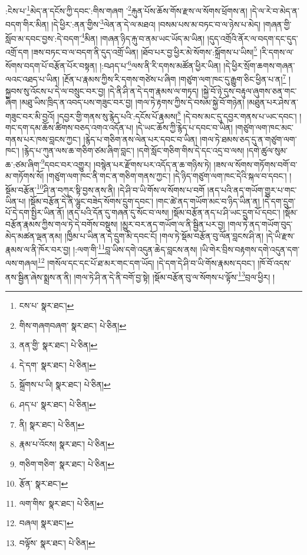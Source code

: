 :ངེས་པ་\footnote{ངས་པ་  སྣར་ཐང་། }མེད་ན་དངོས་ཀྱི་དབང་:གིས་གཞག ་\footnote{གིས་གཞགབཞག་  སྣར་ཐང་།  པེ་ཅིན། }རྐུན་པོས་ཆོས་གོས་རྫས་ལ་སོགས་ཕྲོགས་ན། །དེ་ལ་རེ་བ་མེད་ན་བདག་གིར་མིན། །དེ་ཕྱིར་:ནན་གྱིས་\footnote{ནན་གྱི་  སྣར་ཐང་།  པེ་ཅིན། }ལེན་ན་དེ་ལ་མཐའ། །བསམ་པས་མ་བཏང་བ་ལ་ཉེས་པ་མེད། །གཞན་གྱི་སློབ་མ་དབང་བྱས་:དེ་བདག་\footnote{དེ་དག་  སྣར་ཐང་།  པེ་ཅིན། }མིན། །གཞན་ཉིད་རྐུ་བ་ནམ་ཡང་ཡོད་མ་ཡིན། །དུད་འགྲོའི་ནོར་ལ་བདག་དང་དུད་འགྲོ་དག །ཟས་བཏང་བ་ལ་བདག་ནི་དུད་འགྲོ་ཡིན། །ཐོབ་པར་བྱ་ཕྱིར་མེ་སོགས་:སྐྲོགས་པ་ཡིས།\footnote{སྐྲོགས་པ་ཡི།  སྣར་ཐང་།  པེ་ཅིན། } །རི་དགས་ལ་སོགས་བདག་པོ་བརྩོན་པོར་བསྟན། །:བཤད་པ་\footnote{ཤད་པ་  སྣར་ཐང་།  པེ་ཅིན། }ལས་ནི་རི་དགས་མཚོན་ཕྱིར་ཡིན། །དེ་ཕྱིར་སྲོག་ཆགས་གཞན་ལའང་འཐད་པ་ཡིན། །རྔོན་པ་རྣམས་ཀྱིས་རི་དགས་གཙེས་པ་ཞིག །གཙུག་ལག་ཁང་དུ་རྒྱུག་ཅིང་ཕྱིན་པ་ན།\footnote{ནི།  སྣར་ཐང་།  པེ་ཅིན། } །སྐྱབས་སུ་འོངས་པ་དེ་ལ་བསྲུང་བར་བྱ། །དེ་ནི་ཤི་ན་དེ་དག་རྣམས་ལ་གཏད། །སྐྱེ་བོ་ཉེ་དུས་བརྟུལ་ཞུགས་ཅན་གང་ཞིག །མཐུ་ཡིས་ཁྲིད་ན་འབད་པས་གཟུང་བར་བྱ། །གལ་ཏེ་རྟགས་ཀྱིས་དེ་བསམ་སྐྱེ་བོ་གཉེན། །མཐུན་པར་ཤེས་ན་གཟུང་བར་མི་བྱའོ། །དབྱར་གྱི་གནས་སུ་རྙེད་པའི་:དངོས་པོ་རྣམས།\footnote{རྣམ་པ་འོངས།  སྣར་ཐང་།  པེ་ཅིན། } །དེ་བས་མང་དུ་དབྱར་གནས་པ་ཡང་དབང་། །གང་དག་དམ་ཆོས་ཚིགས་བཅད་འགའ་འདོན་པ། །དེ་ཡང་ཆོས་ཀྱི་རྙེད་པ་དབང་བ་ཡིན། །གཙུག་ལག་ཁང་མང་གནས་པར་ཁས་བླངས་ཀྱང་། །རྙེད་པ་གཅིག་ནས་ལེན་པར་དབང་བ་ཡིན། །གལ་ཏེ་ཐམས་ཅད་དུ་ན་གཙུག་ལག་ཁང་། །རྙེད་པ་ཀུན་ལས་ཆ་གཅིག་ཙམ་ཞིག་བླང་། །དགེ་སློང་གཅིག་གིས་དེ་དང་འདྲ་བ་ལས། །དགེ་ཚུལ་སུམ་ཆ་:ཙམ་ཞིག་\footnote{གཅིག་གཅིག་  སྣར་ཐང་།  པེ་ཅིན། }དབང་བར་འགྱུར། །བསྙེན་པར་རྫོགས་པར་འདོད་ན་ཆ་གཉིས་ཏེ། །ཟས་ལ་སོགས་གཏོགས་བགོ་བ་མ་གཏོགས་སོ། །གཙུག་ལག་ཁང་ནི་གང་ན་གཅིག་གནས་ཀྱང་། །དེ་ཉིད་གཙུག་ལག་ཁང་དེའི་སྐལ་བ་དབང་། །སྡོམ་བརྩོན་\footnote{རྩོན་  སྣར་ཐང་། }ཤི་ན་བཀུར་སྟི་བྱས་ནས་ནི། །དེ་ཤི་བ་ཡི་གོས་ལ་སོགས་པ་བགོ །ནད་པའི་ནད་གཡོག་གྱུར་པ་གང་ཡིན་པ། །སྡོམ་བརྩོན་དེ་ནི་ལྷུང་བཟེད་སོགས་དྲུག་དབང་། །གང་ཚེ་ནད་གཡོག་མང་བ་ཉིད་ཡིན་ན། །དེ་དག་དྲུག་པོ་དེ་དག་སྤྱིར་ཡིན་ནོ། །ནད་པའི་དོན་དུ་གཞན་དུ་སོང་བ་ལས། །སྡོམ་བརྩོན་ནད་པ་ཤི་ཡང་དྲུག་པོ་དབང་། །སྡོམ་བརྩོན་རྣམས་ཀྱིས་གལ་ཏེ་དེ་བགོས་བསྡུས། །མྱུར་བར་ནད་གཡོག་ལ་ནི་སྦྱིན་པར་བྱ། །གལ་ཏེ་ནད་གཡོག་བུད་མེད་མཚན་ལྡན་ནམ། །ཁྱིམ་པ་ཡིན་ན་དེ་དྲུག་མི་དབང་ངོ། །གལ་ཏེ་སྡོམ་བརྩོན་བུ་ལོན་བླངས་ཤི་ན། །དེ་ཡི་རྫས་རྣམས་ལ་ནི་ཁོར་བར་བྱ། །:ལག་གི་\footnote{ལག་གིས་  སྣར་ཐང་།  པེ་ཅིན། }བླ་ཡིས་དགེ་འདུན་ཆེད་བླངས་ནས། །ཡི་གེར་བྲིས་བརྟགས་དགེ་འདུན་དག་ལས་གཞལ།\footnote{བཞལ།  སྣར་ཐང་། } །གསོལ་དང་དང་པོ་ཐ་མར་གང་དག་ཡོད། །དེ་དག་དེ་ཤི་བ་ཡི་གོས་རྣམས་དབང་། །ཁོ་བོ་འདས་ནས་སྦྱིན་ཞེས་སྨྲས་ན་ནི། །གལ་ཏེ་ཤི་ན་དེ་ནི་བགོ་བྱ་སྟེ། །སྡོམ་བརྩོན་བུ་ལ་སོགས་པ་ལྟོས་\footnote{བལྟོས་  སྣར་ཐང་།  པེ་ཅིན། }བྲལ་ཕྱིར། །
